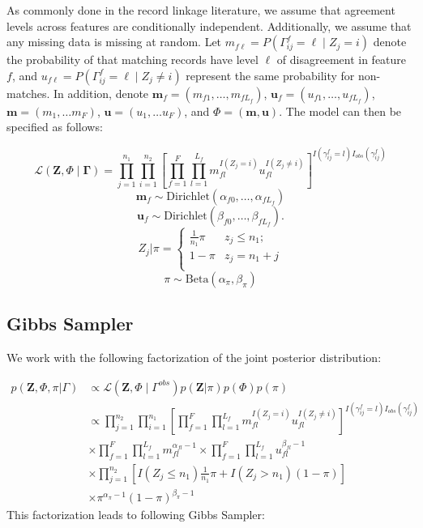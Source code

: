 \documentclass[12pt,letterpaper]{article}
\newcommand{\1}[1]{\mathbb{I}\!\left[#1\right]} %
\begin{document}
As commonly done in the record linkage literature, we assume that agreement levels across features are conditionally independent. Additionally, we assume that any missing data is missing at random. Let  $m_{f\ell} = P(\Gamma_{ij}^f = \ell \mid Z_j = i)$ denote the probability of that matching records have level $\ell$ of disagreement in feature $f$, and $u_{f\ell} = P(\Gamma_{ij}^f = \ell \mid Z_j \neq i)$ represent the same probability for non-matches. In addition, denote $\bm{m}_f = (m_{f1}, \ldots, m_{fL_f})$, $\bm{u}_f = (u_{f1}, \ldots, u_{fL_f})$, $\bm{m}= (m_1, \ldots m_F)$, $\bm{u}= (u_1, \ldots u_F)$, and $\Phi = (\bm{m}, \bm{u})$.
The model can then be specified as follows:

$$\mathcal{L}(\bm{Z}, \Phi \mid \bm{\Gamma}) = \prod_{j=1}^{n_1}  \prod_{i=1}^{n_2}\left[ \prod_{f=1}^{F}\prod_{l=1}^{L_f} m_{fl}^{I(Z_j = i)}u_{fl}^{I(Z_j \neq i)}\right]^{I(\gamma_{ij}^f = l)I_{obs}(\gamma_{ij}^f)}$$
$$\bm{m}_f \sim \text{Dirichlet}(\alpha_{f0}, \ldots, \alpha_{f L_f})$$
$$\bm{u}_f \sim \text{Dirichlet}(\beta_{f0}, \ldots, \beta_{f L_f}).$$
$$Z_j | \pi =
\begin{cases} 
	\frac{1}{n_1}\pi  & z_j \leq n_1; \\
	1-\pi &  z_j  = n_1 + j \\
\end{cases}$$
$$\pi \sim \text{Beta}(\alpha_{\pi}, \beta_{\pi})$$


\hypertarget{posterior-sampling}{%
	\subsection{Gibbs Sampler}
	\label{gibbs_sampling}}
We work with the following factorization of the joint posterior distribution:

\begin{align*}
	p(\mathbf{Z}, \Phi, \pi|\Gamma) &\propto \mathcal{L}(\bm{Z}, \Phi \mid \Gamma^{obs}) p(\mathbf{Z} | \pi) p(\Phi) p(\pi) \\
	&\propto \prod_{j=1}^{n_2}  \prod_{i=1}^{n_1}\left[ \prod_{f=1}^{F}\prod_{l=1}^{L_f} m_{fl}^{I(Z_j = i)}u_{fl}^{I(Z_j \neq i)}\right]^{I(\gamma_{ij}^f = l)I_{obs}(\gamma_{ij}^f)} \\
	&\times  \prod_{f=1}^{F}\prod_{l=1}^{L_f} m_{fl}^{\alpha_{fl} - 1}  \times\prod_{f=1}^{F}\prod_{l=1}^{L_f} u_{fl}^{\beta_{fl} - 1} \\
	&\times \prod_{j=1}^{n_2} \left[I(Z_j \leq n_1)\frac{1}{n_1}\pi + I(Z_j > n_1)(1 - \pi)\right] \\
	&\times \pi^{\alpha_{\pi} -1} (1-\pi)^{\beta_{\pi} -1}
\end{align*}
This factorization leads to following Gibbs Sampler:
\end{document}
